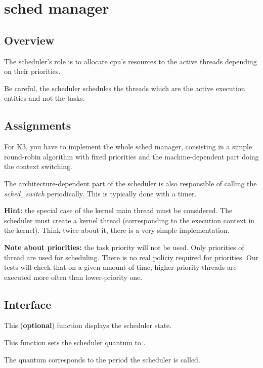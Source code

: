 %
%

\newpage

\section{\textbf{sched} manager}
\subsection*{Overview}

The scheduler's role is to allocate cpu's resources to the
active threads depending on their priorities.

Be careful, the scheduler schedules the threads which are the active
execution entities and not the tasks.

\subsection*{Assignments}

For K3, you have to implement the whole sched manager, consisting
in a simple round-robin algorithm with fixed priorities and the
machine-dependent part doing the context switching.

The architecture-dependent part of the scheduler is also
responsible of calling the \emph{sched\_switch} periodically. This
is typically done with a timer.

\textbf{Hint:} the special case of the kernel main thread must be
considered. The scheduler must create a kernel thread
(corresponding to the execution context in the kernel). Think
twice about it, there is a very simple implementation.

\textbf{Note about priorities:} the task priority will not be
used. Only priorities of thread are used for scheduling. There is
no real policiy required for priorities. Our tests will check that
on a given amount of time, higher-priority threads are executed
more often than lower-priority one.

\subsection*{Interface}

{
  This (\textbf{optional}) function displays the scheduler state.
}

{
  This function sets the scheduler quantum to .

  The quantum corresponds to the period the scheduler is called.
}

